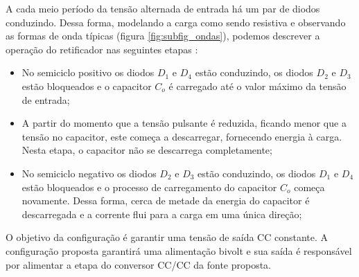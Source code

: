 A cada meio período da tensão alternada de entrada há um par de diodos conduzindo. Dessa forma, modelando a carga como sendo resistiva e observando as formas de onda típicas (figura \ref{fig:subfig_ondas}), podemos descrever a operação do retificador nas seguintes etapas \cite{retificador}:

\begin{itemize}
    \item  No semiciclo positivo os diodos $D_{1}$ e $D_{4}$ estão conduzindo, os diodos $D_{2}$ e $D_{3}$ estão bloqueados e o capacitor $C_{o}$ é carregado até o valor máximo da tensão de entrada;
    
    \item A partir do momento que a tensão pulsante é reduzida, ficando menor que a tensão no capacitor, este começa a descarregar, fornecendo energia à carga. Nesta etapa, o capacitor não se descarrega completamente;
    
    \item No semiciclo negativo os diodos $D_{2}$ e $D_{3}$ estão conduzindo, os diodos $D_{1}$ e $D_{4}$ estão bloqueados e o processo de carregamento do capacitor $C_{o}$ começa novamente. Dessa forma, cerca de metade da energia do capacitor é descarregada e a corrente flui para a carga em uma única direção;
    
\end{itemize}


O objetivo da configuração é garantir uma tensão de saída CC constante. A configuração proposta garantirá uma alimentação bivolt e sua saída é responsável por alimentar a etapa do conversor CC/CC da fonte proposta.


